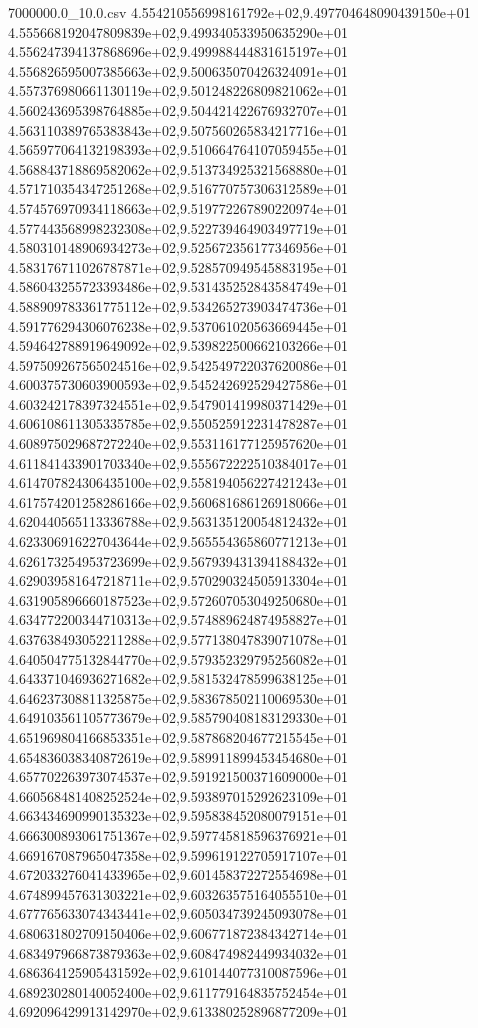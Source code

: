 \begin{filecontents*}{7000000.0_10.0.csv}
4.554210556998161792e+02,9.497704648090439150e+01
4.555668192047809839e+02,9.499340533950635290e+01
4.556247394137868696e+02,9.499988444831615197e+01
4.556826595007385663e+02,9.500635070426324091e+01
4.557376980661130119e+02,9.501248226809821062e+01
4.560243695398764885e+02,9.504421422676932707e+01
4.563110389765383843e+02,9.507560265834217716e+01
4.565977064132198393e+02,9.510664764107059455e+01
4.568843718869582062e+02,9.513734925321568880e+01
4.571710354347251268e+02,9.516770757306312589e+01
4.574576970934118663e+02,9.519772267890220974e+01
4.577443568998232308e+02,9.522739464903497719e+01
4.580310148906934273e+02,9.525672356177346956e+01
4.583176711026787871e+02,9.528570949545883195e+01
4.586043255723393486e+02,9.531435252843584749e+01
4.588909783361775112e+02,9.534265273903474736e+01
4.591776294306076238e+02,9.537061020563669445e+01
4.594642788919649092e+02,9.539822500662103266e+01
4.597509267565024516e+02,9.542549722037620086e+01
4.600375730603900593e+02,9.545242692529427586e+01
4.603242178397324551e+02,9.547901419980371429e+01
4.606108611305335785e+02,9.550525912231478287e+01
4.608975029687272240e+02,9.553116177125957620e+01
4.611841433901703340e+02,9.555672222510384017e+01
4.614707824306435100e+02,9.558194056227421243e+01
4.617574201258286166e+02,9.560681686126918066e+01
4.620440565113336788e+02,9.563135120054812432e+01
4.623306916227043644e+02,9.565554365860771213e+01
4.626173254953723699e+02,9.567939431394188432e+01
4.629039581647218711e+02,9.570290324505913304e+01
4.631905896660187523e+02,9.572607053049250680e+01
4.634772200344710313e+02,9.574889624874958827e+01
4.637638493052211288e+02,9.577138047839071078e+01
4.640504775132844770e+02,9.579352329795256082e+01
4.643371046936271682e+02,9.581532478599638125e+01
4.646237308811325875e+02,9.583678502110069530e+01
4.649103561105773679e+02,9.585790408183129330e+01
4.651969804166853351e+02,9.587868204677215545e+01
4.654836038340872619e+02,9.589911899453454680e+01
4.657702263973074537e+02,9.591921500371609000e+01
4.660568481408252524e+02,9.593897015292623109e+01
4.663434690990135323e+02,9.595838452080079151e+01
4.666300893061751367e+02,9.597745818596376921e+01
4.669167087965047358e+02,9.599619122705917107e+01
4.672033276041433965e+02,9.601458372272554698e+01
4.674899457631303221e+02,9.603263575164055510e+01
4.677765633074343441e+02,9.605034739245093078e+01
4.680631802709150406e+02,9.606771872384342714e+01
4.683497966873879363e+02,9.608474982449934032e+01
4.686364125905431592e+02,9.610144077310087596e+01
4.689230280140052400e+02,9.611779164835752454e+01
4.692096429913142970e+02,9.613380252896877209e+01

\end{filecontents*}
